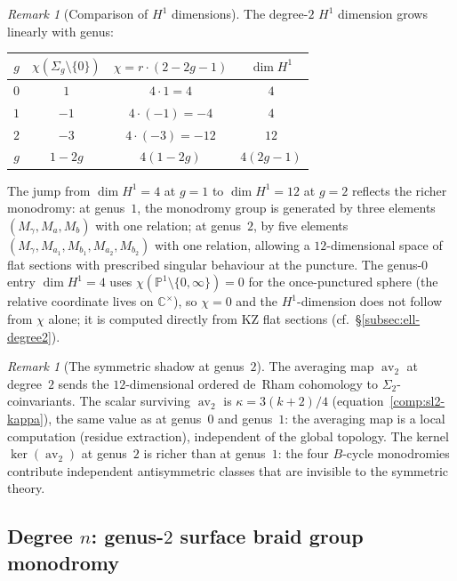 \documentclass[11pt,reqno]{amsart}
\theoremstyle{definition}
\theoremstyle{remark}
\newtheorem{remark}[theorem]{Remark}
\DeclareMathOperator{\av}{av}
\newcommand{\CC}{\mathbb{C}}
\newcommand{\PP}{\mathbb{P}}
\numberwithin{equation}{section}
\begin{document}
\begin{remark}[Comparison of $H^1$ dimensions]
\label{rem:h1-comparison}
The degree-$2$ $H^1$ dimension grows linearly with genus:
\begin{center}
\renewcommand{\arraystretch}{1.2}
\begin{tabular}{@{} c c c c @{}}
  \toprule
  $g$ & $\chi({\Sigma_g \setminus \{0\}})$ &
  $\chi = r \cdot (2 - 2g - 1)$ & $\dim H^1$ \\
  \midrule
  $0$ & $1$ & $4 \cdot 1 = 4$ & $4$ \\
  $1$ & $-1$ & $4 \cdot (-1) = -4$ & $4$ \\
  $2$ & $-3$ & $4 \cdot (-3) = -12$ & $12$ \\
  $g$ & $1 - 2g$ & $4(1 - 2g)$ & $4(2g - 1)$ \\
  \bottomrule
\end{tabular}
\end{center}
The jump from $\dim H^1 = 4$ at $g = 1$ to $\dim H^1 = 12$
at $g = 2$ reflects the richer monodromy: at genus~$1$, the
monodromy group is generated by three elements
$(M_\gamma, M_a, M_b)$ with one relation; at genus~$2$,
by five elements $(M_\gamma, M_{a_1}, M_{b_1}, M_{a_2},
M_{b_2})$ with one relation, allowing a $12$-dimensional
space of flat sections with prescribed singular behaviour at
the puncture. The genus-$0$ entry $\dim H^1 = 4$ uses
$\chi(\PP^1 \setminus \{0, \infty\}) = 0$ for the
once-punctured sphere (the relative coordinate lives on
$\CC^\times$), so
$\chi = 0$ and the $H^1$-dimension does not follow from
$\chi$ alone; it is computed directly from KZ flat sections
\textup{(}cf.\ \S\ref{subsec:ell-degree2}\textup{)}.
\end{remark}

\begin{remark}[The symmetric shadow at genus~$2$]
\label{rem:g2-shadow}
The averaging map $\av_2$ at degree~$2$ sends the
$12$-dimensional ordered de~Rham cohomology to
$\Sigma_2$-coinvariants. The scalar surviving $\av_2$ is
$\kappa = 3(k+2)/4$
(equation~\eqref{comp:sl2-kappa}), the same value as at
genus~$0$ and genus~$1$: the averaging map is a local
computation (residue extraction), independent of the global
topology.
The kernel $\ker(\av_2)$ at genus~$2$ is richer than at
genus~$1$: the four $B$-cycle monodromies contribute
independent antisymmetric classes that are invisible to the
symmetric theory.
\end{remark}

\subsection{Degree $n$: genus-$2$ surface braid group
monodromy}
\label{subsec:g2-degree-n}
\end{document}
